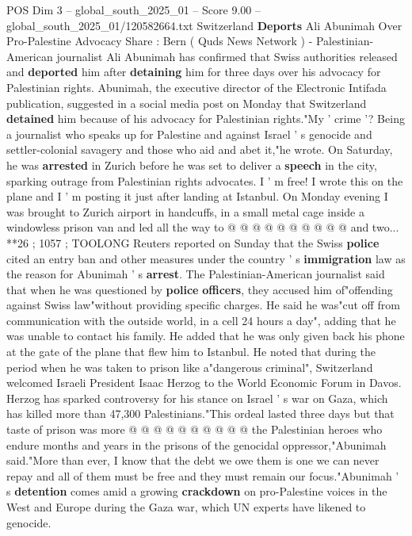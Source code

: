 \begin{textsample}{POS Dim 3 – global\_south\_2025\_01 – Score 9.00 – global\_south\_2025\_01/120582664.txt}  \label{ex:f3_pos_405}
Switzerland \textbf{Deports} Ali Abunimah Over Pro-Palestine Advocacy Share : Bern ( Quds News Network ) - Palestinian-American journalist Ali Abunimah has confirmed that Swiss authorities released and \textbf{deported} him after \textbf{detaining} him for three days over his advocacy for Palestinian rights.
Abunimah, the executive director of the Electronic Intifada publication, suggested in a social media post on Monday that Switzerland \textbf{detained} him because of his advocacy for Palestinian rights."My ' crime '?
Being a journalist who speaks up for Palestine and against Israel ' s genocide and settler-colonial savagery and those who aid and abet it,"he wrote.
On Saturday, he was \textbf{arrested} in Zurich before he was set to deliver a \textbf{speech} in the city, sparking outrage from Palestinian rights advocates.
I ' m free!
I wrote this on the plane and I ' m posting it just after landing at Istanbul.
On Monday evening I was brought to Zurich airport in handcuffs, in a small metal cage inside a windowless prison van and led all the way to @ @ @ @ @ @ @ @ @ @ and two... **26 ; 1057 ; TOOLONG Reuters reported on Sunday that the Swiss \textbf{police} cited an entry ban and other measures under the country ' s \textbf{immigration} law as the reason for Abunimah ' s \textbf{arrest}.
The Palestinian-American journalist said that when he was questioned by \textbf{police} \textbf{officers}, they accused him of"offending against Swiss law"without providing specific charges.
He said he was"cut off from communication with the outside world, in a cell 24 hours a day", adding that he was unable to contact his family.
He added that he was only given back his phone at the gate of the plane that flew him to Istanbul.
He noted that during the period when he was taken to prison like a"dangerous criminal", Switzerland welcomed Israeli President Isaac Herzog to the World Economic Forum in Davos.
Herzog has sparked controversy for his stance on Israel ' s war on Gaza, which has killed more than 47,300 Palestinians."This ordeal lasted three days but that taste of prison was more @ @ @ @ @ @ @ @ @ @ the Palestinian heroes who endure months and years in the prisons of the genocidal oppressor,"Abunimah said."More than ever, I know that the debt we owe them is one we can never repay and all of them must be free and they must remain our focus."Abunimah ' s \textbf{detention} comes amid a growing \textbf{crackdown} on pro-Palestine voices in the West and Europe during the Gaza war, which UN experts have likened to genocide.

\end{textsample}
